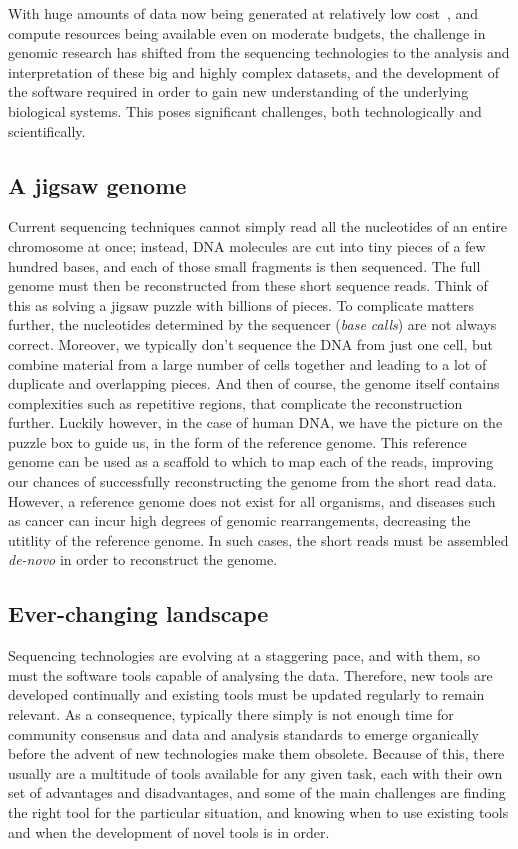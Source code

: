 \begin{justify}
With huge amounts of data now being generated at relatively low cost~\cite{chen2014big}, and compute resources being available even on moderate budgets, the challenge in genomic research has shifted from the sequencing technologies to the analysis and interpretation of these big and highly complex datasets, and the development of the software required in order to gain new understanding of the underlying biological systems. This poses significant challenges, both technologically and scientifically.


\subsection{A jigsaw genome}
Current sequencing techniques cannot simply read all the nucleotides of an entire chromosome at once; instead, DNA molecules are cut into tiny pieces of a few hundred bases, and each of those small fragments is then sequenced. The full genome must then be reconstructed from these short sequence reads. Think of this as solving a jigsaw puzzle with billions of pieces. To complicate matters further, the nucleotides determined by the sequencer (\emph{base calls}) are not always correct. Moreover, we typically don't sequence the DNA from just one cell, but combine material from a large number of cells together and leading to a lot of duplicate and overlapping pieces. And then of course, the genome itself contains complexities such as repetitive regions, that complicate the reconstruction further. Luckily however, in the case of human DNA, we have the picture on the puzzle box to guide us, in the form of the reference genome. This reference genome can be used as a scaffold to which to map each of the reads, improving our chances of successfully reconstructing the genome from the short read data. However, a reference genome does not exist for all organisms, and diseases such as cancer can incur high degrees of genomic rearrangements, decreasing the utitlity of the reference genome. In such cases, the short reads must be assembled \emph{de-novo} in order to reconstruct the genome.

\subsection{Ever-changing landscape}
Sequencing technologies are evolving at a staggering pace, and with them, so must the software tools capable of analysing the data. Therefore, new tools are developed continually and existing tools must be updated regularly to remain relevant. As a consequence, typically there simply is not enough time for community consensus and data and analysis standards to emerge organically before the advent of new technologies make them obsolete. Because of this, there usually are a multitude of tools available for any given task, each with their own set of advantages and disadvantages, and some of the main challenges are finding the right tool for the particular situation, and knowing when to use existing tools and when the development of novel tools is in order.



\end{justify}

